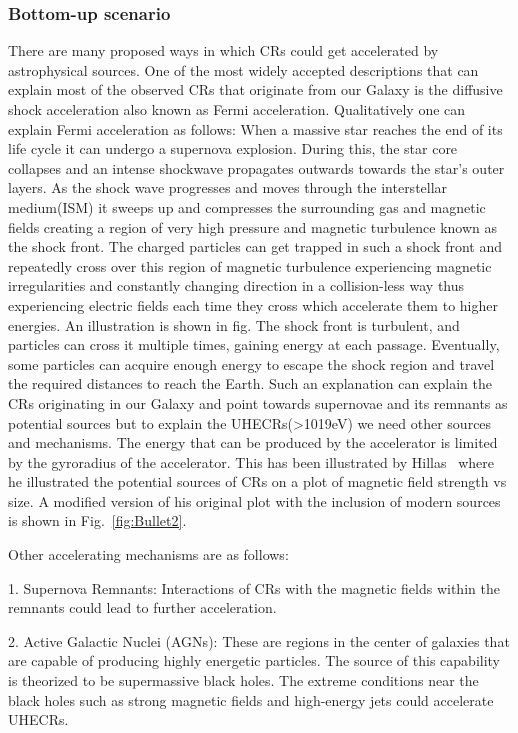\subsubsection{Bottom-up scenario}
\label{subsec:Bupsce}
There are many proposed ways in which CRs could get accelerated by astrophysical sources. One of the most widely accepted descriptions that can explain most of the observed CRs that originate from our Galaxy is the diffusive shock acceleration also known as Fermi acceleration. Qualitatively one can explain Fermi acceleration as follows: When a massive star reaches the end of its life cycle it can undergo a supernova explosion. During this, the star core collapses and an intense shockwave propagates outwards towards the star's outer layers. As the shock wave progresses and moves through the interstellar medium(ISM) it sweeps up and compresses the surrounding gas and magnetic fields creating a region of very high pressure and magnetic turbulence known as the shock front. The charged particles can get trapped in such a shock front and repeatedly cross over this region of magnetic turbulence experiencing magnetic irregularities and constantly changing direction in a collision-less way thus experiencing electric fields each time they cross which accelerate them to higher energies. An illustration is shown in fig. The shock front is turbulent, and particles can cross it multiple times, gaining energy at each passage. Eventually, some particles can acquire enough energy to escape the shock region and travel the required distances to reach the Earth. Such an explanation can explain the CRs originating in our Galaxy and point towards supernovae and its remnants as potential sources but to explain the UHECRs(>1019eV) we need other sources and mechanisms. The energy that can be produced by the accelerator is limited by the gyroradius of the accelerator. This has been illustrated by Hillas~\cite{} where he illustrated the potential sources of CRs on a plot of magnetic field strength vs size. A modified version of his original plot with the inclusion of modern sources is shown in Fig.~\ref{fig:Bullet2}.   

Other accelerating mechanisms are as follows:


1. Supernova Remnants:  Interactions of CRs with the magnetic fields within the remnants could lead to further acceleration.

2. Active Galactic Nuclei (AGNs): These are regions in the center of galaxies that are capable of producing highly energetic particles. The source of this capability is theorized to be supermassive black holes. The extreme conditions near the black holes such as strong magnetic fields and high-energy jets could accelerate UHECRs.

